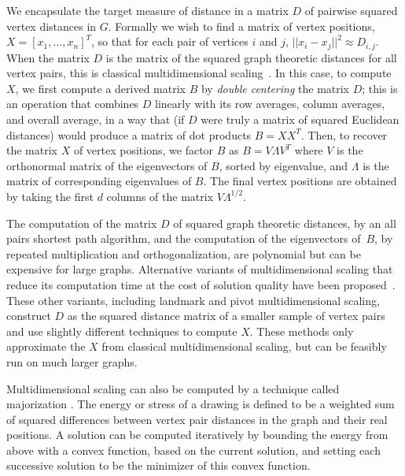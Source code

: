 \documentclass[oribibl,10pt]{llncs}
\begin{document}
\begin{appendix}
We encapsulate the target measure of distance in a matrix $D$ of pairwise squared vertex distances in $G$.  Formally we wish to find a matrix of vertex positions, $X = [x_1,\dots,x_n]^T$, so that for each pair of vertices $i$ and $j$, $||x_i - x_j||^2 \approx D_{i,j}$.  When the matrix $D$ is the matrix of the squared graph theoretic distances for all vertex pairs, this is classical multidimensional scaling~.  In this case, to compute $X$, we first compute a derived matrix $B$ by \emph{double centering} the matrix $D$; this is an operation that combines $D$ linearly with its row averages, column averages, and overall average, in a way that (if $D$ were truly a matrix of squared Euclidean distances) would produce a matrix of dot products  $B= XX^T$. Then, to recover the matrix $X$ of vertex positions, we factor $B$ as $B=V\Lambda V^T$ where $V$ is the orthonormal matrix of the eigenvectors of $B$, sorted by eigenvalue, and $\Lambda$ is the matrix of corresponding eigenvalues of $B$.  The final vertex positions are obtained by taking the first $d$ columns of the matrix $V\Lambda^{1/2}$.

The computation of the matrix $D$ of squared graph theoretic distances, by an all pairs shortest path algorithm, and the computation of the eigenvectors of~$B$, by repeated multiplication and orthogonalization, are polynomial but can be expensive for large graphs.  Alternative variants of multidimensional scaling that reduce its computation time at the cost of solution quality have been proposed~.  These other variants, including landmark and pivot multidimensional scaling, construct $D$ as the squared distance matrix of a smaller sample of vertex pairs and use slightly different techniques to compute $X$. These methods only approximate the $X$ from classical multidimensional scaling, but can be feasibly run on much larger graphs.

Multidimensional scaling can also be computed by a technique called majorization .  The energy or stress of a drawing is defined to be a weighted sum of squared differences between vertex pair distances in the graph and their real positions.  A solution can be computed iteratively by bounding the energy from above with a convex function, based on the current solution, and setting each successive solution to be the minimizer of this convex function.


\end{appendix}
\end{document}
